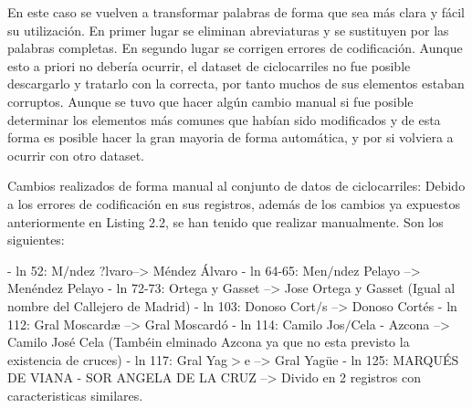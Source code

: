 

En este caso se vuelven a transformar palabras de forma que sea más clara y fácil su utilización.
En primer lugar se eliminan abreviaturas y se sustituyen por las palabras completas.
\newline
En segundo lugar se corrigen errores de codificación. Aunque esto a priori no debería ocurrir, el dataset de ciclocarriles no fue posible descargarlo y tratarlo con la correcta, por tanto muchos de sus elementos estaban corruptos. Aunque se tuvo que hacer algún cambio manual si fue posible determinar los elementos más comunes que habían sido modificados y de esta forma es posible hacer la gran mayoria de forma automática, y por si volviera a ocurrir con otro dataset.
\newline


  \item Cambios realizados de forma manual al conjunto de datos de ciclocarriles:
\newline
\newline
Debido a los errores de codificación en sus registros, además de los cambios ya expuestos anteriormente en Listing 2.2, se han tenido que realizar manualmente. Son los siguientes:
\begin{tiny}
\newline - ln 52: M$/$ndez ?lvaro--> Méndez Álvaro
\newline - ln 64-65: Men$/$ndez Pelayo --> Menéndez Pelayo
\newline - ln 72-73: Ortega y Gasset --> Jose Ortega y Gasset (Igual al nombre del Callejero de Madrid)
\newline - ln 103: Donoso Cort$/$s --> Donoso Cortés
\newline - ln 112: Gral Moscardæ --> Gral Moscardó
\newline - ln 114: Camilo Jos$/$Cela - Azcona --> Camilo José Cela (Tambéin elminado Azcona ya que no esta previsto la existencia de cruces)
\newline - ln 117: Gral Yag$>$e --> Gral Yagüe
\newline - ln 125: MARQUÉS DE VIANA - SOR ANGELA DE LA CRUZ --> Divido en 2 registros con caracteristicas similares.
\newline
\end{tiny}

